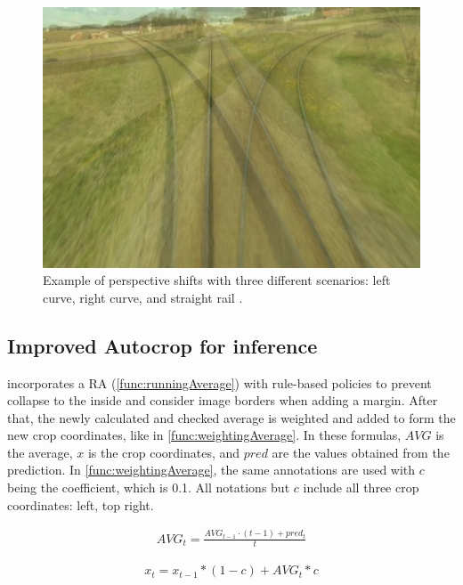 \begin{figure}[H]
    \centering
    \includegraphics[width=0.7\linewidth]{PICs/Baselinepaper/perspective_shifts.jpg}
    \caption{Example of perspective shifts with three different scenarios: left curve, right curve, and straight rail \cite{tepNet2024}.}
    \label{fig:perspective_shifts}
\end{figure}

\subsection{Improved Autocrop for inference}
\label{sec:imporvedAutocrop}

\cite{tepNet2024} incorporates a \ac{RA} (\autoref{func:runningAverage}) with rule-based policies to prevent collapse to the inside and consider image borders when adding a margin. After that, the newly calculated and checked average is weighted and added to form the new crop coordinates, like in \autoref{func:weightingAverage}. In these formulas, $AVG$ is the average, $x$ is the crop coordinates, and $pred$ are the values obtained from the prediction. In \autoref{func:weightingAverage}, the same annotations are used with $c$ being the coefficient, which is 0.1. All notations but $c$ include all three crop coordinates: left, top right.

\begin{align}
    AVG_t = \frac{AVG_{t-1} \cdot (t-1) + pred_t}{t}
    \label{func:runningAverage}
\end{align}

\begin{align}
    x_{t} = x_{t-1} * (1 - c) + AVG_{t} * c
    \label{func:weightingAverage}
\end{align}

